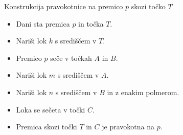 \begin{frame}{Konstrukcija pravokotnice na premico $p$ skozi točko $T$}
	\begin{minipage}{0.55\textwidth}
		  \begin{itemize}
			 \item Dani sta premica $p$ in točka $T$.
			 \pause
			 \item Nariši lok $k$ s središčem v $T$.
			 \pause
			 \item Premico $p$ seče v točkah $A$ in $B$.
			 \pause
			 \item Nariši lok $m$ s središčem v $A$.
			 \pause
			 \item Nariši lok $n$ s središčem v $B$ in z enakim polmerom.
			 \pause
			 \item Loka se sečeta v točki $C$.
			 \pause
			 \item Premica skozi točki $T$ in $C$ je pravokotna na $p$.
			 \pause
		  \end{itemize}
	\end{minipage}\hfill
	\begin{minipage}{0.45\textwidth}
		\centering

\end{minipage}
\end{frame}
